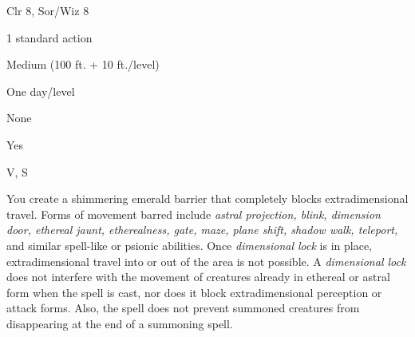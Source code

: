 
\begin{description*}
\item[Level:] Clr 8, Sor/Wiz 8
\item[Casting Time:] 1 standard action
\item[Range:] Medium (100 ft. + 10 ft./level)
\item[Duration:] One day/level
\item[Saving Throw:] None
\item[Spell Resistance:] Yes
\item[Components:] V, S
\end{description*}

You create a shimmering emerald barrier that completely blocks extradimensional
travel. Forms of movement barred include \textit{astral projection, blink, dimension
door, ethereal jaunt, etherealness, gate, maze, plane shift, shadow walk, teleport,
}and similar spell-like or psionic abilities. Once \textit{dimensional lock} is
in place, extradimensional travel into or out of the area is not possible.
A \textit{dimensional lock} does not interfere with the movement of creatures already
in ethereal or astral form when the spell is cast, nor does it block extradimensional
perception or attack forms. Also, the spell does not prevent summoned creatures
from disappearing at the end of a summoning spell.